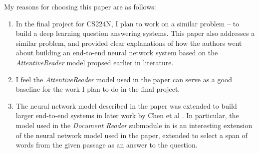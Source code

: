 My reasons for choosing this paper are as follows:
\begin{enumerate}
\item In the final project for CS224N, I plan to work on a similar problem -- to build a deep learning question answering systems. This paper also addresses a similar problem, and provided clear explanations of how the authors went about building an end-to-end neural network system based on the \textit{AttentiveReader} model \cite{hermann2015teaching} propsed earlier in literature.
\item I feel the \textit{AttentiveReader} model used in the paper can serve as a good baseline for the work I plan to do in the final project.
\item The neural network model described in the paper was extended to build larger end-to-end systems in later work by Chen et al \cite{chen2017reading}. In particular, the model used in the \textit{Document Reader} submodule in \cite{chen2017reading} is an interesting extension of the neural network model used in the paper, extended to select a span of words from the given passage as an answer to the question.

\end{enumerate}

